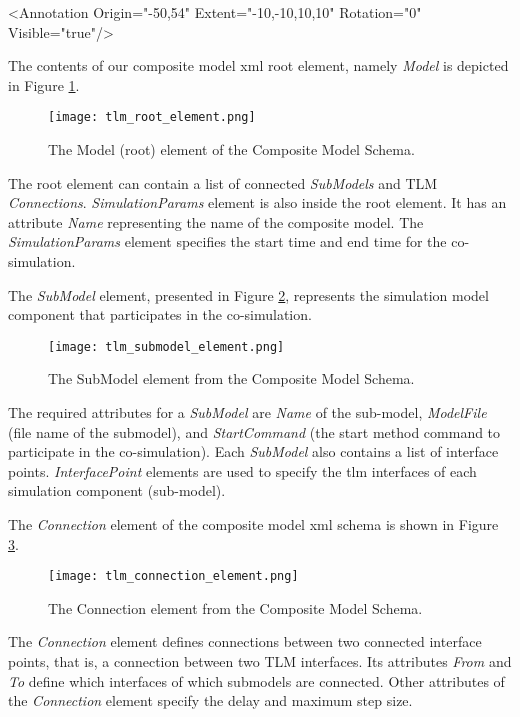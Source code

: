 <Annotation Origin="{-50,54}" Extent="{-10,-10,10,10}" Rotation="0" Visible="true"/>

The contents of our composite model \acrshort{xml} root element, namely \textit{Model} is depicted in Figure \ref{fig:tlmerootelement}.

\begin{figure} [!h]
	\texttt{[image: tlm\_root\_element.png]}
	\caption{The Model (root) element of the Composite Model Schema.}
	\label{fig:tlmerootelement}
\end{figure}
 

The root element can contain a list of connected \textit{SubModels} and TLM \textit{Connections}. \textit{SimulationParams} element is also inside the root element. 
It has an attribute \textit{Name} representing the name of the composite model. The \textit{SimulationParams} element specifies the start time and end time for the co-simulation.

The \textit{SubModel} element, presented in Figure \ref{fig:tlmsubmodelelement}, represents the simulation model component that participates in the co-simulation. 

\begin{figure} [!h]
	\texttt{[image: tlm\_submodel\_element.png]}
	\caption{The SubModel element from the Composite Model Schema.}
	\label{fig:tlmsubmodelelement}
\end{figure}

The required attributes for a \textit{SubModel} are \textit{Name} of the sub-model, \textit{ModelFile} (file name of the submodel), and \textit{StartCommand} (the start method command to participate in the co-simulation). Each \textit{SubModel} also contains a list of interface points. \textit{InterfacePoint} elements are used to specify the \acrshort{tlm} interfaces of each simulation component (sub-model). 

The \textit{Connection} element of the composite model \acrshort{xml} schema is shown in Figure \ref{fig:tlmconnectionelement}.

\begin{figure} [!h]
	\texttt{[image: tlm\_connection\_element.png]}
	\caption{The Connection element from the Composite Model Schema.}
	\label{fig:tlmconnectionelement}
\end{figure}

The \textit{Connection} element defines connections between two connected interface points, that is, 
a connection between two TLM interfaces. Its attributes \textit{From} and \textit{To} define which interfaces of which submodels are connected. Other attributes of the \textit{Connection} element specify the delay and maximum step size. 

